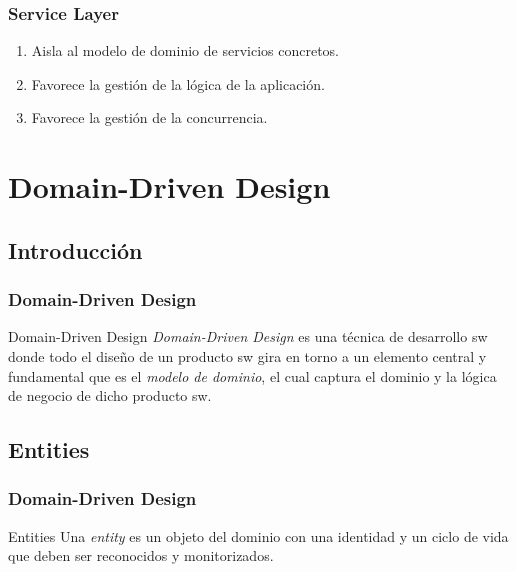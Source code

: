 \documentclass[a4paper,slidestop,xcolor=pst,dvips,blue]{beamer}
\begin{document}
\begin{frame}[c]
    \frametitle{Service Layer}
    \begin{enumerate}
        \item<1-> Aisla al modelo de dominio de servicios concretos.
        \item<2-> Favorece la gestión de la lógica de la aplicación.
        \item<3-> Favorece la gestión de la concurrencia.
    \end{enumerate}
\end{frame}

\section{Domain-Driven Design}

\subsection{Introducción}

\begin{frame}[c]
    \frametitle{Domain-Driven Design}
     \begin{block}{Domain-Driven Design}
     \alert{\emph{Domain-Driven Design}} es una técnica de desarrollo sw donde todo el diseño de un producto sw gira en torno a un elemento central y fundamental que es el \emph{modelo de dominio}, el cual captura el dominio y la lógica de negocio de dicho producto sw.
     \end{block}


\end{frame}

%
\subsection{Entities}

\begin{frame}[c]
    \frametitle{Domain-Driven Design}
     \begin{block}{Entities}
        Una \emph{entity} es un objeto del dominio con una identidad y un ciclo de vida que deben ser reconocidos y monitorizados.
     \end{block}
\end{frame}
\end{document}

